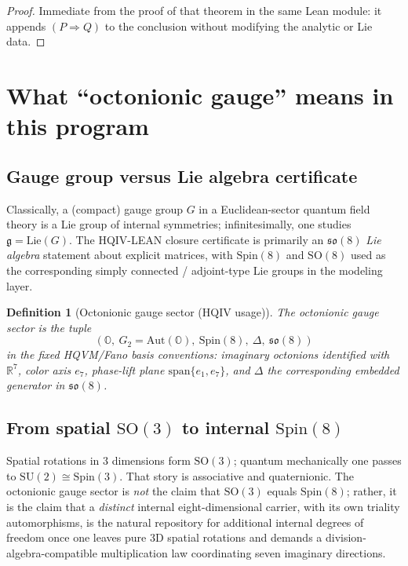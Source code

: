 \documentclass[11pt]{amsart}
\newtheorem{definition}[theorem]{Definition}
\begin{document}
\begin{proof}
Immediate from the proof of that theorem in the same Lean module: it appends \((P\Rightarrow Q)\) to the conclusion without modifying the analytic or Lie data.
\end{proof}

\section{What ``octonionic gauge'' means in this program}

\subsection{Gauge group versus Lie algebra certificate}

Classically, a (compact) gauge group \(G\) in a Euclidean-sector quantum field theory is a Lie group of internal symmetries; infinitesimally, one studies \(\mathfrak{g}=\mathrm{Lie}(G)\). The HQIV-LEAN closure certificate is primarily an \(\mathfrak{so}(8)\) \emph{Lie algebra} statement about explicit matrices, with \(\mathrm{Spin}(8)\) and \(\mathrm{SO}(8)\) used as the corresponding simply connected / adjoint-type Lie groups in the modeling layer.

\begin{definition}[Octonionic gauge sector (HQIV usage)]
The \emph{octonionic gauge sector} is the tuple
\[
(\mathbb{O},\ G_2=\mathrm{Aut}(\mathbb{O}),\ \mathrm{Spin}(8),\ \Delta,\ \mathfrak{so}(8))
\]
in the fixed HQVM/Fano basis conventions: imaginary octonions identified with \(\mathbb{R}^7\), color axis \(e_7\), phase-lift plane \(\mathrm{span}\{e_1,e_7\}\), and \(\Delta\) the corresponding embedded generator in \(\mathfrak{so}(8)\).
\end{definition}

\subsection{From spatial \texorpdfstring{\(\mathrm{SO}(3)\)}{SO(3)} to internal \texorpdfstring{\(\mathrm{Spin}(8)\)}{Spin(8)}}

Spatial rotations in \(3\) dimensions form \(\mathrm{SO}(3)\); quantum mechanically one passes to \(\mathrm{SU}(2)\cong \mathrm{Spin}(3)\). That story is associative and quaternionic. The octonionic gauge sector is \emph{not} the claim that \(\mathrm{SO}(3)\) equals \(\mathrm{Spin}(8)\); rather, it is the claim that a \emph{distinct} internal eight-dimensional carrier, with its own triality automorphisms, is the natural repository for additional internal degrees of freedom once one leaves pure \(3\)D spatial rotations and demands a division-algebra-compatible multiplication law coordinating seven imaginary directions.
\end{document}
